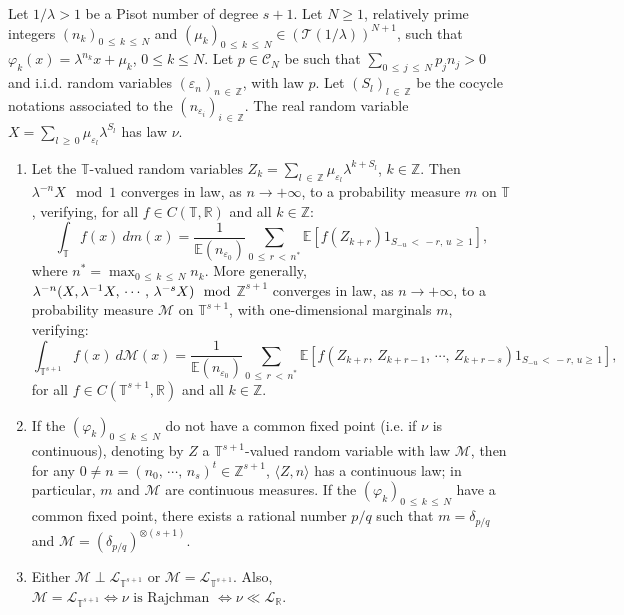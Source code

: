 \documentclass[AHL,Unicode,longabstracts,published]{cedram}
\newcommand{\Ebb}{\mathbb E}
\newcommand{\Tbb}{\mathbb T}
\newcommand{\Rbb}{\mathbb R}
\newcommand{\Zbb}{\mathbb Z}
\newcommand{\Lcl}{\mathcal{L}}
\newcommand{\Ccl}{\mathcal{C}}
\newcommand{\Tcl}{\mathcal{T}}
\newcommand{\Mcl}{\mathcal{M}}
\newcommand*{\romanenumi}{\renewcommand*{\theenumi}{\roman{enumi}}}
\begin{document}
\begin{theo}\label{part2}
Let $1/\lambda>1$ be a Pisot number of degree $s+1$. Let $N\geq 1$, relatively prime integers $(n_k)_{0\,\leq\,k\,\leq\,N}$ and $(\mu_k)_{0\,\leq\,k\,\leq\,N}\in ({\Tcl}(1/\lambda))^{N+1}$, such that $\varphi_k(x)=\lambda^{n_k}x+\mu_k$, $0\leq k\leq N$. Let $p\in{\Ccl}_N$ be such that $\sum_{0\,\leq\,j\,\leq\,N}p_jn_j>0$ and i.i.d. random variables $(\varepsilon_n)_{n\,\in\,\Zbb}$, with law $p$. Let $(S_l)_{l\,\in\,\Zbb}$ be the cocycle notations associated to the $(n_{\varepsilon_i})_{i\,\in\,\Zbb}$. The real random variable $X=\sum_{l\,\geq\,0}\mu_{\varepsilon_l}\lambda^{S_l}$ has law $\nu$.


\begin{enumerate}\romanenumi
\item \label{theo2.6.1}Let the $\Tbb$-valued random variables $Z_k=\sum_{l\,\in\,\Zbb}\mu_{\varepsilon_l}\lambda^{k+S_l}$, $k\in\Zbb$. Then $\lambda^{-n}X\mod 1$ converges in law, as $n\rightarrow+\infty$, to a probability measure $m$ on $\Tbb$, verifying, for all $f\in C(\Tbb,\Rbb)$ and all $k\in\Zbb$:
\[
\int_{\Tbb} f(x)~dm(x)=\frac{1}{\Ebb(n_{\varepsilon_0})}\sum_{0\,\leq\,r\,<\,n^*}\Ebb\left[{f\left({Z_{k+r}}\right)1_{S_{-u}\,<\,-r,\,u\,\geq\,1}}\right],
\]
where $n^*=\max_{0\,\leq\,k\,\leq\,N}n_k$. More generally, $\lambda^{-n}(X,\lambda^{-1}X,\,\cdots,\,\lambda^{-s}X)\mod$\linebreak$\Zbb^{s+1}$ converges in law, as $n\rightarrow+\infty$, to a probability measure $\Mcl$ on $\Tbb^{s+1}$, with one-dimensional marginals $m$, verifying:
\[
\int_{\Tbb^{s+1}} f(x)~d{\Mcl}(x)=\frac{1}{\Ebb(n_{\varepsilon_0})}\sum_{0\,\leq\,r\,<\,n^*}\Ebb\left[{f\left({Z_{k+r},\,Z_{k+r-1},\,\cdots,\,Z_{k+r-s}}\right)1_{S_{-u}\,<\,-r,\,u\geq\,1}}\right],
\]
for all $f\in C(\Tbb^{s+1},\Rbb)$ and all $k\in\Zbb$.


\item \label{theo2.6.2}If the $(\varphi_k)_{0\,\leq\,k\,\leq\,N}$ do not have a common fixed point (i.e. if $\nu$ is continuous), denoting by $Z$ a $\Tbb^{s+1}$-valued random variable with law $\Mcl$, then for any $0\not=n=(n_0,\,\cdots,\,n_s)^t\in\Zbb^{s+1}$, $\langle Z,n\rangle$ has a continuous law; in particular, $m$ and ${\Mcl}$ are continuous measures. If the $(\varphi_k)_{0\,\leq\,k\,\leq\,N}$ have a common fixed point, there exists a rational number $p/q$ such that $m=\delta_{p/q}$ and ${\Mcl}=(\delta_{p/q})^{\otimes (s+1)}$.


\item \label{theo2.6.3}Either ${\Mcl}\perp{\Lcl}_{\Tbb^{s+1}}$ or ${\Mcl}={\Lcl}_{\Tbb^{s+1}}$. Also, ${\Mcl}={\Lcl}_{\Tbb^{s+1}}\Leftrightarrow \nu\text{ is Rajchman }\Leftrightarrow\nu\ll{\Lcl}_{\Rbb}$.
\end{enumerate}
\end{theo}
\end{document}
